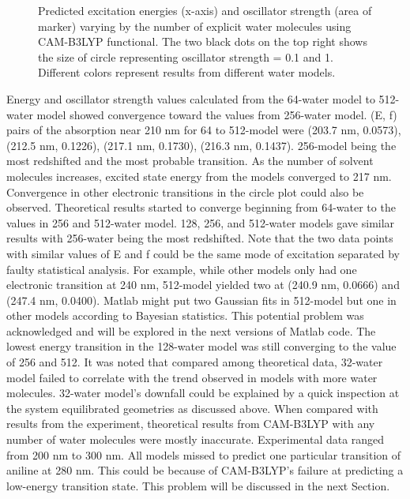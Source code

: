 \documentclass[
journal=jpcbfk, %
manuscript=article]{achemso}
\begin{document}
		\begin{figure}[!htb]
			\centering		
			\caption{Predicted excitation energies (x-axis) and oscillator strength (area of marker) varying by the number of explicit water molecules using CAM-B3LYP functional. The two black dots on the top right shows the size of circle representing oscillator strength = 0.1 and 1. Different colors represent results from different water models.}
			\label{fig:anilineByNumberOfWater}
		\end{figure}

	 Energy and oscillator strength values calculated from the 64-water model to 512-water model showed convergence toward the values from 256-water model. (E, f) pairs of the absorption near 210 nm for 64 to 512-model  were (203.7 nm, 0.0573), (212.5 nm, 0.1226), (217.1 nm, 0.1730), (216.3 nm, 0.1437).  256-model being the most redshifted and the most probable transition. As the number of solvent molecules increases, excited state energy from the models converged to 217 nm. Convergence in other electronic transitions in the circle plot could also be observed. Theoretical results started to converge beginning from 64-water to the values in 256 and 512-water model. 128, 256, and 512-water models gave similar results with 256-water being the most redshifted. Note that the two data points with similar values of E and f could be the same mode of excitation separated by faulty statistical analysis. For example, while other models only had one electronic transition at 240 nm, 512-model yielded two at (240.9 nm, 0.0666) and (247.4 nm, 0.0400). Matlab might put two Gaussian fits in 512-model but one in other models according to Bayesian statistics. This potential problem was acknowledged and will be explored in the next versions of Matlab code. The lowest energy transition in the 128-water model was still converging to the value of 256 and 512. It was noted that compared among theoretical data, 32-water model failed to correlate with the trend observed in models with more water molecules. 32-water model's downfall could be explained by a quick inspection at the system equilibrated geometries as discussed above. When compared with results from the experiment, theoretical results from CAM-B3LYP with any number of water molecules were mostly inaccurate. Experimental data ranged from 200 nm to 300 nm. All models missed to predict one particular transition of aniline at 280 nm. This could be because of CAM-B3LYP's failure at predicting a low-energy transition state. This problem will be discussed in the next Section.
\end{document}
